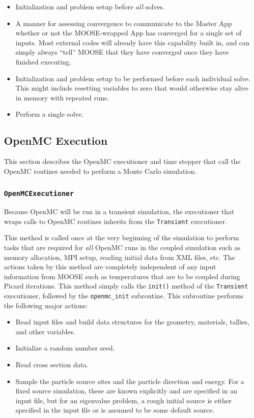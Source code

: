 \documentclass[10pt]{article}
\newcounter{subsubsubsection}[subsubsection]
\numberwithin{equation}{section} %
\begin{document}
\begin{itemize}
\item Initialization and problem setup before {\it all} solves.
\item A manner for assessing convergence to communicate to the Master App whether or not the MOOSE-wrapped App has converged for a single set of inputs. Most external codes will already have this capability built in, and can simply always ``tell'' MOOSE that they have converged once they have finished executing.
\item Initialization and problem setup to be performed before each individual solve. This might include resetting variables to zero that would otherwise stay alive in memory with repeated runs.
\item Perform a single solve.
\end{itemize}

\subsection{OpenMC Execution}
This section describes the OpenMC executioner and time stepper that call the OpenMC routines needed to perform a Monte Carlo simulation. 

\subsubsection{{\tt OpenMCExecutioner}}
Because OpenMC will be run in a transient simulation, the executioner that wraps calls to OpenMC routines inherits from the {\tt Transient} executioner.

This method is called once at the very beginning of the simulation to perform tasks that are required for {\it all} OpenMC runs in the coupled simulation such as memory allocation, MPI setup, reading initial data from XML files, etc. The actions taken by this method are completely independent of any input information from MOOSE such as temperatures that are to be coupled during Picard iterations. This method simply calls the {\tt init()} method of the {\tt Transient} executioner, followed by the {\tt openmc\_init} subroutine. This subroutine performs the following major actions:

\begin{itemize}
\item Read input files and build data structures for the geometry, materials, tallies, and other variables.
\item Initialize a random number seed.
\item Read cross section data.
\item Sample the particle source sites and the particle direction and energy. For a fixed source simulation, these are known explicitly and are specified in an input file, but for an eigenvalue problem, a rough initial source is either specified in the input file or is assumed to be some default source. 
\end{itemize}
\end{document}
